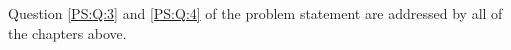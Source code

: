 Question \ref{PS:Q:3} and \ref{PS:Q:4} of the problem statement are addressed by all of the chapters above.

%
%
%
%
%
%




